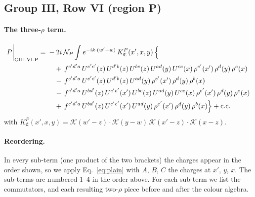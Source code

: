 \documentclass[10pt]{article}
\numberwithin{equation}{section}
\newcommand{\KK}{\mathcal K}
\newcommand{\NP}{\mathcal N_{P}}
\begin{document}
\subsection{Group III, Row VI (region P)}\label{sec:GIII.VI.P}

\paragraph{The three-$\rho$ term.}
\begin{align}
P\bigg|_{\rm GIII.VI.P}={}&-2i\,\NP\int e^{-ik\cdot(w'-w)}\,K^{P}_{\mathfrak C}(x',x,y)\,\Big\{\notag\\
&\quad +\,f^{c'd'a}\,U^{e'c'}(z)\,U^{d'b}(z)\,U^{bc}(z)\,U^{ad}(y)\,U^{ce}(x)\,\rho^{e'}(x')\,\rho^{d}(y)\,\rho^{e}(x)\notag\\
&\quad -\,f^{c'd'a}\,U^{e'c'}(z)\,U^{d'b}(z)\,U^{ad}(y)\,\rho^{e'}(x')\,\rho^{d}(y)\,\rho^{b}(x)\notag\\
&\quad -\,f^{c'd'a}\,U^{bd'}(z)\,U^{c'e'}(x')\,U^{bc}(z)\,U^{ad}(y)\,U^{ce}(x)\,\rho^{e'}(x')\,\rho^{d}(y)\,\rho^{e}(x)\notag\\
&\quad +\,f^{c'd'a}\,U^{bd'}(z)\,U^{c'e'}(x')\,U^{ad}(y)\,\rho^{e'}(x')\,\rho^{d}(y)\,\rho^{b}(x)\Big\}+{\rm c.c.}\label{eq:in-GIII.VI.P}
\end{align}
with $K^{P}_{\mathfrak C}(x',x,y)=\KK(w'-z)\cdot\KK(y-w)\,\KK(x'-z)\cdot\KK(x-z)$.
\paragraph{Reordering.} In every sub-term (one product of the two brackets) the charges appear in the order shown, so we apply Eq.~\eqref{eq:plain} with $A$, $B$, $C$ the charges at $x'$, $y$, $x$. The sub-terms are numbered 1--4 in the order above. For each sub-term we list the commutators, and each resulting two-$\rho$ piece before and after the colour algebra.
\end{document}
